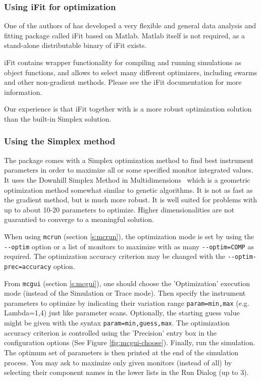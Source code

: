\subsubsection{Using iFit for optimization}

One of the authors of \MCS has developed a very flexible and general data
analysis and fitting package called iFit \cite{iFit,iFit_web} based on
Matlab. Matlab itself is not required, as a stand-alone distributable binary of
iFit exists.

iFit contains wrapper functionality for compiling and running \MCS simulations
as object functions, and allows to select many different optimizers, including
swarms and other non-gradient methods. Please see the iFit documentation for
more information.

Our experience is that iFit together with \MCS is a more robust optimization
solution than the \MCS built-in Simplex solution.

\subsubsection{Using the Simplex method}

The \MCS package comes with a Simplex optimization method to find best
instrument parameters in order to maximize all or some specified monitor
integrated values. It uses the Downhill Simplex Method in
Multidimensions~\cite{neldermead,NumRecip} which is a geometric optimization
method somewhat similar to genetic algorithms. It is not as fast as the gradient
method, but is much more robust. It is well suited for problems with up to about
10-20 parameters to optimize. Higher dimensionalities are not guarantied to
converge to a meaningful solution.

When using \verb+mcrun+ (section \ref{s:mcrun}), the optimization mode is set by
using the \verb+--optim+ option or a list of monitors to maximize with as many
\verb+--optim=COMP+ as required. The optimization accuracy criterion may be
changed with the \verb+--optim-prec=accuracy+ option.

From \verb+mcgui+ (section \ref{s:mcgui}), one should choose the 'Optimization'
execution mode (instead of the Simulation or Trace mode). Then specify the
instrument parameters to optimize by indicating their variation range
\verb+param=min,max+ (e.g. Lambda=1,4) just like parameter scans. Optionally,
the starting guess value might be given with the syntax
\verb+param=min,guess,max+. The optimization accuracy criterion is controlled
using the 'Precision' entry box in the configuration options (See Figure
\ref{fig:mcgui-choose}). Finally, run the simulation. The optimum set of
parameters is then printed at the end of the simulation process. You may ask to
maximize only given monitors (instead of all) by selecting their component names
in the lower lists in the Run Dialog (up to 3).

